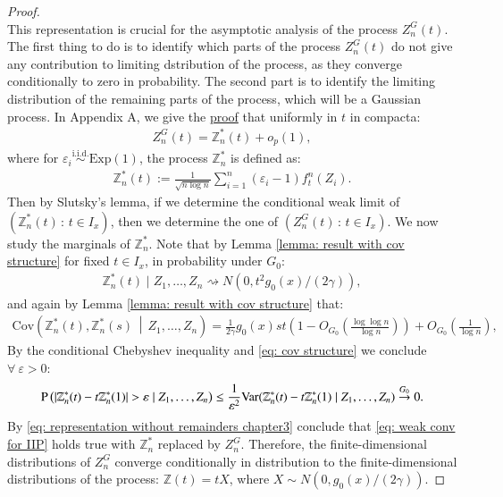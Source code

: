\begin{proof}
\[\]
This representation is crucial for the asymptotic analysis of the process \( Z^{\scriptscriptstyle{G}}_n(t) \). The first thing to do is to identify which parts of the process \( Z^{\scriptscriptstyle{G}}_n(t) \) do not give any contribution to limiting dstribution of the process, as they converge conditionally to zero in probability. The second part is to identify the limiting distribution of the remaining parts of the process, which will be a Gaussian process. In Appendix A, we give the \hyperlink{proof of reduction}{proof} that uniformly in $t$ in compacta:
\begin{align}\label{eq: representation without remainders chapter3}
	Z^{\scriptscriptstyle{G}}_n(t) = \mathbb{Z}^*_n (t) + o_p(1),
\end{align}
where for \( \varepsilon_i \overset{\text{i.i.d.}}{\sim} \text{Exp}(1) \), the process $\mathbb{Z}^*_n$ is defined as:
\begin{align}\label{eq: mathbbZ process}
    \mathbb{Z}^*_n (t) := \frac{1}{\sqrt{n \log n}} \sum_{i=1}^n \left( \varepsilon_i - 1 \right) f_t^n(Z_i).
\end{align}
Then by Slutsky's lemma, if we determine the conditional weak limit of \( (\mathbb{Z}_n^\ast(t) \, : \, t \in I_x) \), then we determine the one of \( (Z^{\scriptscriptstyle{G}}_n(t) \, : \, t \in I_x) \). We now study the marginals of $\mathbb{Z}^*_n$. Note that by Lemma \ref{lemma: result with cov structure} for fixed $t \in I_x$, in probability under $G_0$:
\begin{align}\label{eq: weak conv for IIP}
	\mathbb{Z}^*_n (t) \mid Z_1, \ldots, Z_n \rightsquigarrow N\left(0, t^2  g_0(x)/ (2 \gamma) \right),
\end{align}
and again by Lemma \ref{lemma: result with cov structure} that:
\begin{align}\label{eq: cov structure}
\text{Cov}\left(\mathbb{Z}_n^\ast(t), \mathbb{Z}_n^\ast(s) \,\middle|\, Z_1, \dots, Z_n\right) 
= \frac{1}{2 \gamma} g_0(x) st \left( 1 - O_{\scriptscriptstyle{G_0}}\left(\frac{\log \log n}{\log n} \right) \right) + O_{\scriptscriptstyle{G_0}}\left(\frac{1}{\log n}\right),
\end{align}
By the conditional Chebyshev inequality and \eqref{eq: cov structure} we conclude $\forall \: \varepsilon >0$:
\begin{align*}
    \mathrm{P} \left( | \mathbb{Z}^*_n (t) - t \mathbb{Z}^*_n (1) | > \varepsilon \mid Z_1, \ldots, Z_n \right) \leq \frac{1}{\varepsilon^2} \mathrm{Var}( \mathbb{Z}^*_n (t) - t \mathbb{Z}^*_n (1)  \mid Z_1, \ldots, Z_n ) \stackrel{G_0}{\rightarrow} 0.
\end{align*}
By \eqref{eq: representation without remainders chapter3} conclude that \eqref{eq: weak conv for IIP} holds true with $\mathbb{Z}^*_n $ replaced by $Z^{\scriptscriptstyle{G}}_n$. Therefore, the finite-dimensional distributions of $Z^{\scriptscriptstyle{G}}_n$ converge conditionally in distribution to the finite-dimensional distributions of the process: $ \mathbb{Z}(t) = tX$, where $X \sim N(0,g_0(x)/(2\gamma))$. 


\end{proof}
